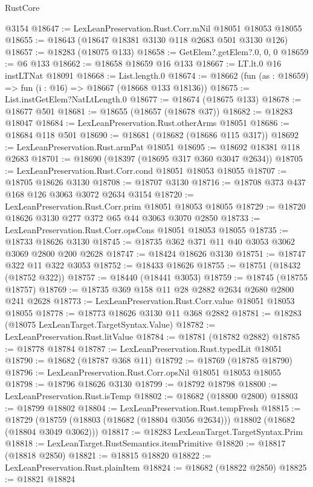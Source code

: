 \begin{lexlean}{RustCore}
\begin{coremodule}
    @3154
@18647 := LexLeanPreservation.Rust.Corr.mNil @18051 @18053 @18055
@18655 := @18643 (@18647 @18381 @3130 @118 @2683 @501 @3130 @126)
@18657 := @18283 (@18075 @133)
@18658 := GetElem?.getElem?.{0, 0, 0}
@18659 := @6 @133
@18662 := @18658 @18659 @16 @133
@18667 := LT.lt.{0} @16 instLTNat @18091
@18668 := List.length.{0}
@18674 := @18662 (fun (as : @18659) => fun (i : @16) => @18667 (@18668 @133 @18136))
@18675 := List.instGetElem?NatLtLength.{0}
@18677 := @18674 (@18675 @133)
@18678 := @18677 @501
@18681 := @18655 (@18657 (@18678 @37))
@18682 := @18283 @18047
@18684 := LexLeanPreservation.Rust.otherArms @18051
@18686 := @18684 @118 @501
@18690 := @18681 (@18682 (@18686 @115 @317))
@18692 := LexLeanPreservation.Rust.armPat @18051
@18695 := @18692 @18381 @118 @2683
@18701 := @18690 (@18397 (@18695 @317 @360 @3047 @2634))
@18705 := LexLeanPreservation.Rust.Corr.cond @18051 @18053 @18055
@18707 := @18705 @18626 @3130
@18708 := @18707 @3130
@18716 := @18708 @373 @437 @168 @126 @3063 @3072 @2634 @3154
@18720 := LexLeanPreservation.Rust.Corr.prim @18051 @18053 @18055
@18729 := @18720 @18626 @3130 @277 @372 @65 @44 @3063 @3070 @2850
@18733 := LexLeanPreservation.Rust.Corr.opsCons @18051 @18053 @18055
@18735 := @18733 @18626 @3130
@18745 := @18735 @362 @371 @11 @40 @3053 @3062 @3069 @2800 @200 @2628
@18747 := @18424 @18626 @3130
@18751 := @18747 @322 @11 @322 @3053
@18752 := @18433 @18626
@18755 := @18751 (@18432 (@18752 @322))
@18757 := @18440 (@18441 @3053)
@18759 := @18745 (@18755 @18757)
@18769 := @18735 @369 @158 @11 @28 @2882 @2634 @2680 @2800 @241 @2628
@18773 := LexLeanPreservation.Rust.Corr.value @18051 @18053 @18055
@18778 := @18773 @18626 @3130 @11 @368 @2882
@18781 := @18283 (@18075 LexLeanTarget.TargetSyntax.Value)
@18782 := LexLeanPreservation.Rust.litValue
@18784 := @18781 (@18782 @2882)
@18785 := @18778 @18784
@18787 := LexLeanPreservation.Rust.typedLit @18051
@18790 := @18682 (@18787 @368 @11)
@18792 := @18769 (@18785 @18790)
@18796 := LexLeanPreservation.Rust.Corr.opsNil @18051 @18053 @18055
@18798 := @18796 @18626 @3130
@18799 := @18792 @18798
@18800 := LexLeanPreservation.Rust.isTemp
@18802 := @18682 (@18800 @2800)
@18803 := @18799 @18802
@18804 := LexLeanPreservation.Rust.tempFresh
@18815 := @18729
    (@18759 (@18803 (@18682 (@18804 @3056 @2634))) @18802 (@18682 (@18804 @3049 @3062)))
@18817 := @18283 LexLeanTarget.TargetSyntax.Prim
@18818 := LexLeanTarget.RustSemantics.itemPrimitive
@18820 := @18817 (@18818 @2850)
@18821 := @18815 @18820
@18822 := LexLeanPreservation.Rust.plainItem
@18824 := @18682 (@18822 @2850)
@18825 := @18821 @18824

\end{coremodule}
\end{lexlean}
